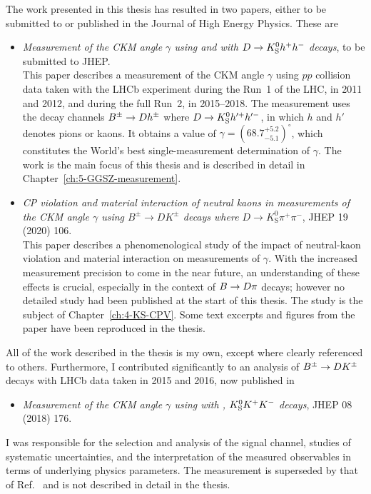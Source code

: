 The work presented in this thesis has resulted in two papers, either to be submitted to or published in the Journal of High Energy Physics. These are
\begin{itemize}

    \item [] \cite{GGSZ-B2Dh} \emph{Measurement of the CKM angle $\gamma$ using \BtoDK and \BtoDpi with ${D}\rightarrow{\ensuremath{{K}^0_{\mathrm{S}}}} h^+ h^-$ decays}, to be submitted to JHEP. \\
    This paper describes a measurement of the CKM angle $\gamma$ using $pp$ collision data taken with the LHCb experiment during the Run~1 of the LHC, in 2011 and 2012, and during the full Run~2, in 2015--2018. The measurement uses the decay channels ${{B}^\pm}\rightarrow{\ensuremath{D}} h^\pm$ where ${D}\rightarrow{\ensuremath{{K}^0_{\mathrm{S}}}} h'^+h'^-$, in which $h$ and $h'$ denotes pions or kaons. It obtains a value of $\gamma= (68.7^{+5.2}_{-5.1})^\circ$, which constitutes the World's best single-measurement determination of $\gamma$. The work is the main focus of this thesis and is described in detail in Chapter~\ref{ch:5-GGSZ-measurement}.

    \item [] \cite{KsCPV} \emph{CP violation and material interaction of neutral kaons
                        in measurements of the CKM angle $\gamma$ using $B^\pm\to
                        DK^\pm$ decays where $D\to K_\text{S}^0\pi^+\pi^-$}, JHEP 19 (2020) 106. \\
                        This paper describes a phenomenological study of the impact of neutral-kaon \CP violation and material interaction on measurements of $\gamma$. With the increased measurement precision to come in the near future, an understanding of these effects is crucial, especially in the context of ${B}\rightarrow{\ensuremath{D}}\pi$ decays; however no detailed study had been published at the start of this thesis. The study is the subject of Chapter~\ref{ch:4-KS-CPV}. Some text excerpts and figures from the paper have been reproduced in the thesis.
\end{itemize}
All of the work described in the thesis is my own, except where clearly referenced to others. Furthermore, I contributed significantly to an analysis of ${{B}^\pm}\rightarrow{\ensuremath{D}}{\ensuremath{{K}^\pm}}$ decays with LHCb data taken in 2015 and 2016, now published in
\begin{itemize}
    \item [] \cite{LHCb-PAPER-2018-017} \emph{Measurement of the CKM angle $\gamma$ using  with , ${{K}^0_{\mathrm{S}}} K^+K^-$ decays}, JHEP 08 (2018) 176.
\end{itemize}
I was responsible for the selection and analysis of the signal channel, studies of systematic uncertainties, and the interpretation of the measured observables in terms of underlying physics parameters. The measurement is superseded by that of Ref.~\cite{GGSZ-B2Dh} and is not described in detail in the thesis.

